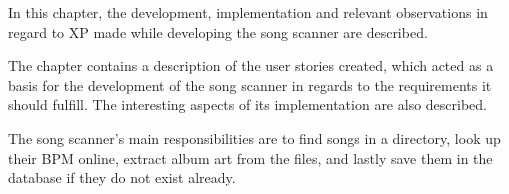 In this chapter, the development, implementation and relevant observations in regard to XP made while developing the song scanner are described. 

The chapter contains a description of the user stories created, which acted as a basis for the development of the song scanner in regards to the requirements it should fulfill. The interesting aspects of its implementation are also described. 

The song scanner's main responsibilities are to find songs in a directory, look up their BPM online, extract album art from the files, and lastly save them in the database if they do not exist already.